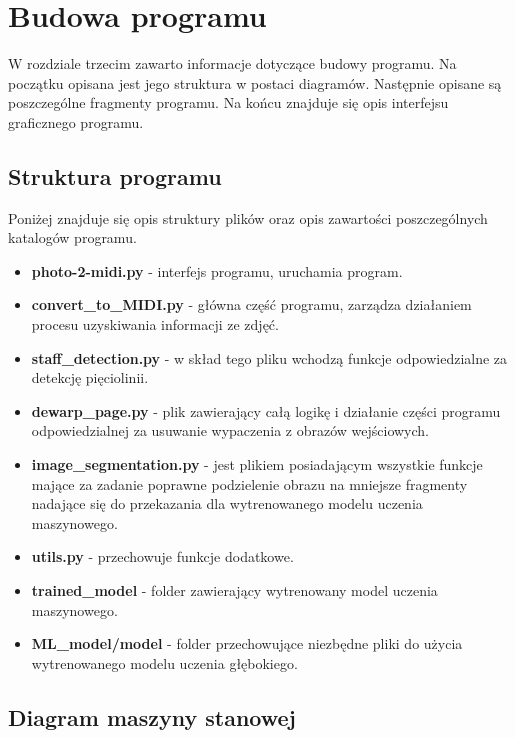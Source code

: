 \chapter{Budowa programu}
W rozdziale trzecim zawarto informacje dotyczące budowy programu. Na początku opisana jest jego struktura w postaci diagramów. Następnie opisane są poszczególne fragmenty programu. Na końcu znajduje się opis interfejsu graficznego programu.


\section{Struktura programu}

Poniżej znajduje się opis struktury plików oraz opis zawartości poszczególnych katalogów programu.

\begin{itemize}
	\item \textbf{photo-2-midi.py} - interfejs programu, uruchamia program.
	\item \textbf{convert\_to\_MIDI.py} - główna część programu, zarządza działaniem procesu uzyskiwania informacji ze zdjęć.
	\item \textbf{staff\_detection.py} - w skład tego pliku wchodzą funkcje odpowiedzialne za detekcję pięciolinii.
	\item \textbf{dewarp\_page.py} - plik zawierający całą logikę i działanie części programu odpowiedzialnej za usuwanie wypaczenia z obrazów wejściowych.
	\item \textbf{image\_segmentation.py} - jest plikiem posiadającym wszystkie funkcje mające za zadanie poprawne podzielenie obrazu na mniejsze fragmenty nadające się do przekazania dla wytrenowanego modelu uczenia maszynowego.
	\item \textbf{utils.py} - przechowuje funkcje dodatkowe.
	\item \textbf{trained\_model} - folder zawierający wytrenowany model uczenia maszynowego.
	\item \textbf{ML\_model/model} - folder przechowujące niezbędne pliki do użycia wytrenowanego modelu uczenia głębokiego.
\end{itemize}

\section{Diagram maszyny stanowej}

